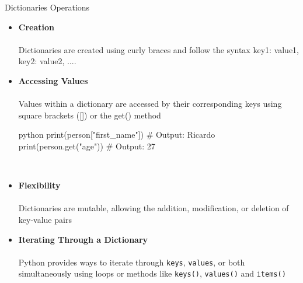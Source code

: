 \documentclass[
	11pt, 
]{beamer}
\begin{document}
\begin{frame}[fragile]{Dictionaries Operations}

\begin{itemize}
    \item \textbf{Creation} \\ \\
    Dictionaries are created using curly braces {} and follow the syntax {key1: value1, key2: value2, ...}.
    
    \item \textbf{Accessing Values} \\ \\
    Values within a dictionary are accessed by their corresponding keys using square brackets ([]) or the get() method

\begin{mintedbox}{python}
print(person["first_name"])  # Output: Ricardo
print(person.get("age"))  # Output: 27
\end{mintedbox}
    \\
    \item \textbf{Flexibility} \\ \\
     Dictionaries are mutable, allowing the addition, modification, or deletion of key-value pairs

    \item \textbf{Iterating Through a Dictionary} \\ \\
     Python provides ways to iterate through \texttt{keys}, \texttt{values}, or both simultaneously using loops or methods like \texttt{keys()}, \texttt{values()} and \texttt{items()}
\end{itemize}
\end{frame}

\end{document}
